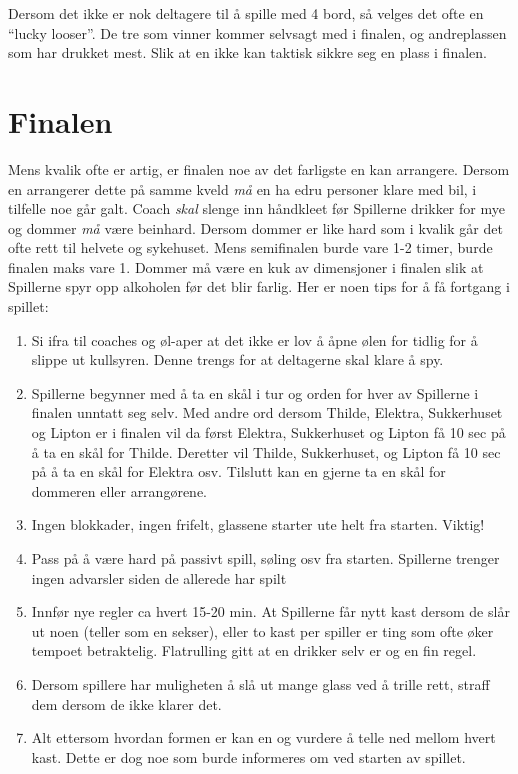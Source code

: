 \documentclass[10pt,a4paper,norsk,openany]{book}
\begin{document}
Dersom det ikke er nok deltagere til å spille med 4 bord, så velges det ofte en
``lucky looser''. De tre som vinner kommer selvsagt med i finalen, og
andreplassen som har drukket mest. Slik at en ikke kan taktisk sikkre seg en
plass i finalen.


\section{Finalen}

Mens kvalik ofte er artig, er finalen noe av det farligste en kan arrangere.
Dersom en arrangerer dette på samme kveld \emph{må} en ha edru personer klare
med bil, i tilfelle noe går galt. Coach \emph{skal} slenge inn håndkleet før
Spillerne drikker for mye og dommer \emph{må} være beinhard. Dersom dommer er
like hard som i kvalik går det ofte rett til helvete og sykehuset. Mens
semifinalen burde vare 1-2 timer, burde finalen maks vare 1. Dommer må være en
kuk av dimensjoner i finalen slik at Spillerne spyr opp alkoholen før det blir
farlig. Her er noen tips for å få fortgang i spillet:

\begin{enumerate}
  \item Si ifra til coaches og øl-aper at det ikke er lov å åpne ølen for tidlig
    for å slippe ut kullsyren. Denne trengs for at deltagerne skal klare å spy.
  \item Spillerne begynner med å ta en skål i tur og orden for hver av
    Spillerne i finalen
    unntatt seg selv. Med andre ord dersom Thilde, Elektra, Sukkerhuset og Lipton
    er i finalen vil da først Elektra, Sukkerhuset og Lipton få 10 sec på å ta
    en skål for Thilde. Deretter vil Thilde, Sukkerhuset, og Lipton få 10 sec på
    å ta en skål for Elektra osv. Tilslutt kan en gjerne ta en skål for
    dommeren eller arrangørene.
  \item Ingen blokkader, ingen frifelt, glassene starter ute helt fra starten.
    Viktig!
  \item Pass på å være hard på passivt spill, søling osv fra starten. Spillerne
    trenger ingen advarsler siden de allerede har spilt
  \item Innfør nye regler ca hvert 15-20 min. At Spillerne får nytt kast dersom
    de slår ut noen (teller som en sekser), eller to kast per spiller er ting
    som ofte øker tempoet betraktelig. Flatrulling gitt at en drikker selv er og
    en fin regel.
  \item Dersom spillere har muligheten å slå ut mange glass ved å trille rett,
    straff dem dersom de ikke klarer det.
  \item Alt ettersom hvordan formen er kan en og vurdere å telle ned mellom
    hvert kast. Dette er dog noe som burde informeres om ved starten av spillet.
\end{enumerate}
\end{document}
